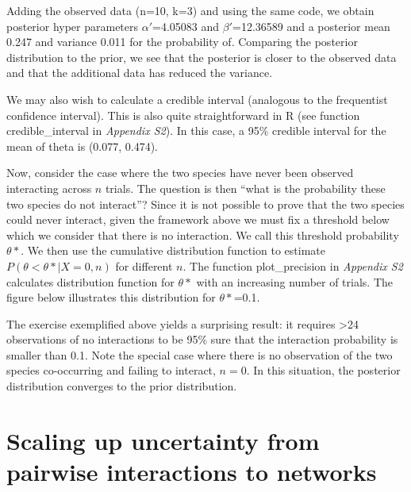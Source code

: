 ﻿\documentclass[12pt]{article}
\begin{document}
    Adding the observed data (n=10, k=3) and using the same code,
    we obtain posterior hyper parameters $\alpha'$=4.05083 and $\beta'$=12.36589 and a posterior mean 0.247 and variance 0.011 for the probability of. Comparing the posterior distribution to the prior, we see that the posterior is closer to the observed data and that the additional data has reduced the variance.


    We may also wish to calculate a credible interval (analogous to the frequentist confidence interval). This is also quite straightforward in R (see function credible\_interval in \emph{Appendix S2}). In this case, a 95\% credible interval for the mean of theta is (0.077, 0.474).


    Now, consider the case where the two species have never been observed interacting across $n$ trials. The question is then ``what is the probability these two species do not interact''? Since it is not possible to prove that the two species could never interact, given the framework above we must fix a threshold below which we consider that there is no interaction. We call this threshold probability $\theta*$. We then use the cumulative distribution function to estimate $P(\theta<\theta*|X=0,n)$ for different $n$. The 
    function plot\_precision in \emph{Appendix S2} calculates distribution function for $\theta*$ with an increasing number of trials. The figure below illustrates this distribution for $\theta*$=0.1.


    The exercise exemplified above yields a surprising result: it requires \textgreater24 observations of no interactions to be 95\% sure that the interaction probability is smaller than 0.1. Note the special case where there is no observation of the two species co-occurring and failing to interact, $n = 0$. In this situation, the posterior distribution converges to the prior distribution. 


\section*{Scaling up uncertainty from pairwise interactions to networks}
\end{document}
